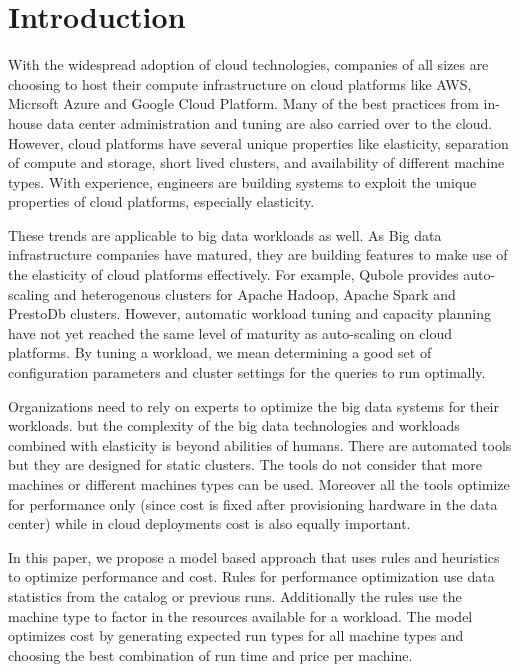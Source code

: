 \section{Introduction}

With the widespread adoption of cloud technologies, companies of all sizes are choosing to host their compute infrastructure on cloud platforms like AWS, Micrsoft Azure and Google Cloud Platform. 
Many of the best practices from in-house data center administration and tuning are also carried over to the cloud. However, cloud platforms have several unique properties like elasticity, separation of compute and storage, short lived clusters, and availability of different machine types. With experience, engineers are building systems to exploit the unique properties
of cloud platforms, especially elasticity. 

These trends are applicable to big data workloads as well. As Big data infrastructure companies have matured, they are building features to make use of the elasticity of cloud platforms effectively. For example, Qubole provides auto-scaling 
and heterogenous clusters for Apache Hadoop, Apache Spark and PrestoDb clusters. 
However, automatic workload tuning and capacity planning have not yet reached the same level of maturity as auto-scaling on cloud platforms. By tuning a workload, we mean determining a good set of configuration parameters and cluster settings for the queries to run optimally. 

Organizations need to rely on experts to optimize the big data systems for their workloads. but the 
complexity of the big data technologies and workloads combined with elasticity is beyond abilities of humans. There are automated tools but they are 
designed for static clusters. The tools do not consider that more machines or different machines types can be used. Moreover all the tools optimize
for performance only (since cost is fixed after provisioning hardware in the data center) while in cloud deployments cost is also equally important. 

In this paper, we propose a model based approach that uses rules and heuristics to optimize performance and cost. Rules for performance optimization
use data statistics from the catalog or previous runs. Additionally the rules use the machine type to factor in the resources available for a workload.
The model optimizes cost by generating expected run types for all machine types and choosing the best combination of run time and price per machine.

